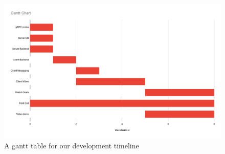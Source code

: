 \documentclass[titlepage]{article}
\begin{document}
	\begin{center}
		\begin{figure}[!ht]
			\includegraphics[scale=.35]{graphics/GanttChart.png}
			\caption{A gantt table for our development timeline}
		\end{figure}
	\end{center}
	
\end{document}
